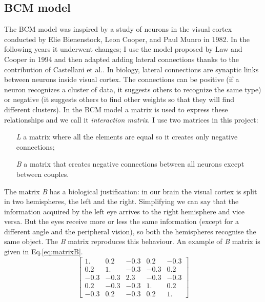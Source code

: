 \documentclass[a4paper,12pt]{article}
\begin{document}
\subsection{BCM model}
The BCM model was inspired by a study of neurons in the visual cortex  conducted by Elie Bienenstock, Leon Cooper, and Paul Munro in 1982\cite{BCM:1982}.
In the following years it underwent changes; I use the model proposed by Law and Cooper in 1994\cite{law:1994} and then adapted adding lateral connections thanks to the contribution of Castellani et al.\cite{castellani:1998}.
In biology, lateral connections are synaptic links between neurons inside visual cortex.
The connections can be positive (if a neuron recognizes a cluster of data, it suggests others to recognize the same type) or negative (it suggests  others to find other weights so that they will find different clusters).
In the BCM model a matrix is used to express these relationships and we call it \emph{interaction matrix}\cite{cooper:1988}.
I use two matrices in this project:
\begin{itemize}
\item[\emph{L}] a matrix where all the elements are equal so it creates only negative connections;
\item[\emph{B}] a matrix that creates negative connections between all neurons except between couples.
\end{itemize}
The matrix \emph{B} has a biological justification: in our brain the visual cortex is split in two hemispheres, the left and the right.
Simplifying we can say that the information acquired by the left eye arrives to the right hemisphere and vice versa.
But the eyes receive more or less the same information (except for a different angle and the peripheral vision), so both the hemispheres recognise the same object.
The \emph{B} matrix reproduces this behaviour\cite{berselli:2023}.
An example of \emph{B} matrix is given in Eq.\ref{eq:matrixB}.
\begin{equation}\label{eq:matrixB}
  \begin{bmatrix}
    1. &  0.2 & -0.3 & 0.2 & -0.3 \\
    0.2 & 1. & -0.3 & -0.3 & 0.2 \\
    -0.3 & -0.3 & 2.3 & -0.3 & -0.3 \\
    0.2 & -0.3 & -0.3 & 1. & 0.2 \\
    -0.3 & 0.2 & -0.3 & 0.2 & 1.
  \end{bmatrix}
\end{equation}
\end{document}
